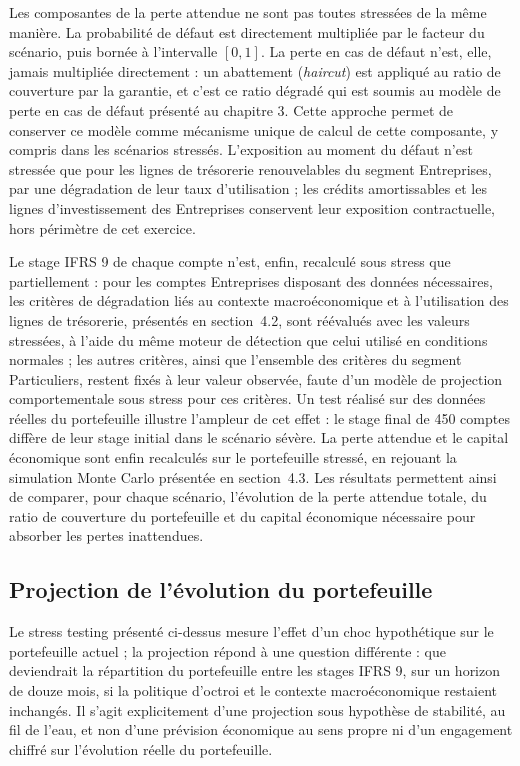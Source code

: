 Les composantes de la perte attendue ne sont pas toutes stressées de la même manière. La probabilité de défaut est directement multipliée par le facteur du scénario, puis bornée à l'intervalle $[0,1]$. La perte en cas de défaut n'est, elle, jamais multipliée directement : un abattement (\emph{haircut}) est appliqué au ratio de couverture par la garantie, et c'est ce ratio dégradé qui est soumis au modèle de perte en cas de défaut présenté au chapitre 3. Cette approche permet de conserver ce modèle comme mécanisme unique de calcul de cette composante, y compris dans les scénarios stressés. L'exposition au moment du défaut n'est stressée que pour les lignes de trésorerie renouvelables du segment Entreprises, par une dégradation de leur taux d'utilisation ; les crédits amortissables et les lignes d'investissement des Entreprises conservent leur exposition contractuelle, hors périmètre de cet exercice.

Le stage IFRS 9 de chaque compte n'est, enfin, recalculé sous stress que partiellement : pour les comptes Entreprises disposant des données nécessaires, les critères de dégradation liés au contexte macroéconomique et à l'utilisation des lignes de trésorerie, présentés en section~4.2, sont réévalués avec les valeurs stressées, à l'aide du même moteur de détection que celui utilisé en conditions normales ; les autres critères, ainsi que l'ensemble des critères du segment Particuliers, restent fixés à leur valeur observée, faute d'un modèle de projection comportementale sous stress pour ces critères. Un test réalisé sur des données réelles du portefeuille illustre l'ampleur de cet effet : le stage final de 450 comptes diffère de leur stage initial dans le scénario sévère. La perte attendue et le capital économique sont enfin recalculés sur le portefeuille stressé, en rejouant la simulation Monte Carlo présentée en section~4.3. Les résultats permettent ainsi de comparer, pour chaque scénario, l'évolution de la perte attendue totale, du ratio de couverture du portefeuille et du capital économique nécessaire pour absorber les pertes inattendues.

\subsection{Projection de l'évolution du portefeuille}

Le stress testing présenté ci-dessus mesure l'effet d'un choc hypothétique sur le portefeuille actuel ; la projection répond à une question différente : que deviendrait la répartition du portefeuille entre les stages IFRS 9, sur un horizon de douze mois, si la politique d'octroi et le contexte macroéconomique restaient inchangés. Il s'agit explicitement d'une projection sous hypothèse de stabilité, au fil de l'eau, et non d'une prévision économique au sens propre ni d'un engagement chiffré sur l'évolution réelle du portefeuille.

